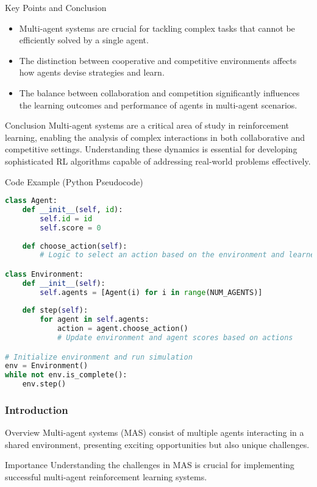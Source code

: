 \documentclass[aspectratio=169]{beamer}
\begin{document}
\begin{frame}[fragile]{Key Points and Conclusion}
    \begin{itemize}
        \item Multi-agent systems are crucial for tackling complex tasks that cannot be efficiently solved by a single agent.
        \item The distinction between cooperative and competitive environments affects how agents devise strategies and learn.
        \item The balance between collaboration and competition significantly influences the learning outcomes and performance of agents in multi-agent scenarios.
    \end{itemize}
    
    \begin{block}{Conclusion}
        Multi-agent systems are a critical area of study in reinforcement learning, enabling the analysis of complex interactions in both collaborative and competitive settings. Understanding these dynamics is essential for developing sophisticated RL algorithms capable of addressing real-world problems effectively.
    \end{block}
\end{frame}

\begin{frame}[fragile]{Code Example (Python Pseudocode)}
    \begin{lstlisting}[language=Python]
class Agent:
    def __init__(self, id):
        self.id = id
        self.score = 0
        
    def choose_action(self):
        # Logic to select an action based on the environment and learned policies

class Environment:
    def __init__(self):
        self.agents = [Agent(i) for i in range(NUM_AGENTS)]
        
    def step(self):
        for agent in self.agents:
            action = agent.choose_action()
            # Update environment and agent scores based on actions

# Initialize environment and run simulation
env = Environment()
while not env.is_complete():
    env.step()
    \end{lstlisting}
\end{frame}

\begin{frame}[fragile]
    \frametitle{Introduction}
    \begin{block}{Overview}
        Multi-agent systems (MAS) consist of multiple agents interacting in a shared environment, presenting exciting opportunities but also unique challenges. 
    \end{block}

    \begin{block}{Importance}
        Understanding the challenges in MAS is crucial for implementing successful multi-agent reinforcement learning systems.
    \end{block}
\end{frame}
\end{document}
